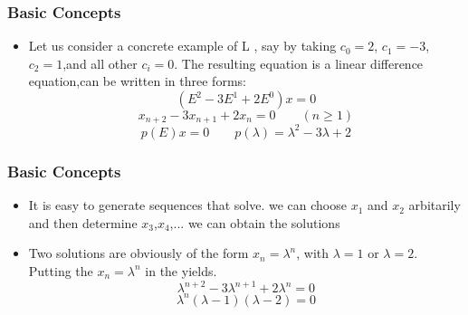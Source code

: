 \documentclass[notheorems,mathserif,table,compress]{beamer}  %
\begin{document}
\begin{frame}
\frametitle{Basic  Concepts}
\begin{itemize}
\item Let us  consider a concrete  example of L , say by  taking $c_0=2$, $c_1={-3}$, $c_2=1$,and  all other $c_i=0$. The resulting equation is a linear difference equation,can be written  in  three forms:
\begin{displaymath}%
{(E^{2}-3E^{1}+2E^{0})}x=0 
\end{displaymath}
\begin{displaymath}
 x_{n+2}-3x_{n+1}+2x_{n}=0 \qquad (n\geq 1)  
\end{displaymath}
\begin{displaymath}
p(E)x=0 \qquad     p(\lambda)=\lambda^{2}-3\lambda +2
\end{displaymath}
\end{itemize}
\end{frame}


\begin{frame}
\frametitle{Basic  Concepts }
\begin{itemize}
\item It is easy to generate sequences that solve. we can choose $x_{1}$ and $x_{2}$ arbitarily and then determine $x_{3}$,$x_{4}$,$...$ we can obtain the solutions  
\begin{displaymath}
[1, 0,{-2}, {-6},{-14},{-30},\ldots] 
\end{displaymath}
\begin{displaymath}
[1, 1, 1, 1,\ldots]   
\end{displaymath}
\begin{displaymath}
[2, 4, 8, 16,\ldots]
\end{displaymath}
\item Two solutions are obviously of the form $x_n=\lambda^{n}$, with $\lambda=1$ or $\lambda=2$. Putting the $x_{n}=\lambda^{n}$ in the yields.
\begin{displaymath}
\lambda^{n+2}-3\lambda^{n+1}+2\lambda^{n}=0
\end{displaymath}
\begin{displaymath}
\lambda^{n}(\lambda-1)(\lambda-2)=0
\end{displaymath} 
\end{itemize}
\end{frame}
\end{document}
